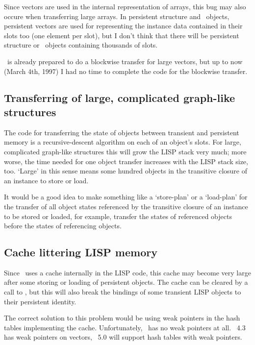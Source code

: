 Since vectors are used in the internal representation of arrays,
this bug may also occure when transferring large arrays. In persistent
structure and \clos\ objects, persistent vectors are used for
representing the instance data contained in their slots too (one
element per slot), but I don't think that there will be persistent
structure or \clos\ objects containing thousands of slots.

\plob\ is already prepared to do a blockwise transfer for
large vectors, but up to now (March 4th, 1997) I had no time to
complete the code for the blockwise transfer.

\subsection{Transferring of large, complicated graph-like structures}

The code for transferring the state of objects between
transient and persistent memory is a recursive-descent algorithm on
each of an object's slots. For large, complicated graph-like
structures this will grow the LISP stack very much; more worse, the
time needed for one object transfer increases with the LISP stack
size, too. `Large' in this sense means some hundred objects in the
transitive closure of an instance to store or load.

It would be a good idea to make something like a `store-plan' or a
`load-plan' for the transfer of all object states referenced by the
transitive closure of an instance to be stored or loaded, for example,
transfer the states of referenced objects before the states of
referencing objects.

\subsection{Cache littering LISP memory}%
\label{sec:CacheLitteringMemory}

Since \plob\ uses a cache internally in the LISP code, this cache may
become very large after some storing or loading of persistent objects.
The cache can be cleared by a call to , but this
will also break the bindings of some transient LISP objects to their
persistent identity.

The correct solution to this problem would be using weak pointers in
the hash tables implementing the cache. Unfortunately, \lwcl\ has no
weak pointers at all. \allegrocl\ 4.3 has weak pointers on vectors,
\allegrocl\ 5.0 will support hash tables with weak pointers.

